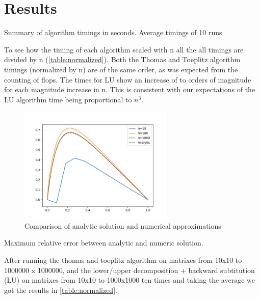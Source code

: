\section*{Results}

\begin{table}[htp]
  \centering
  \caption{Summary of algorithm timings in seconds. Average timings of 10 runs}
  \label{table:normalized}
\end{table}


To see how the timing of each algorithm scaled with n all the 
all timings are divided by n (\cref{table:normalized}). Both the Thomas and
Toeplitz algorithm timings (normalized by n) are of the same order, as was
expected from the counting of flops. The times for LU show an increase of to
orders of magnitude for each magnitude increase in n. This is consistent with
our expectations of the LU algorithm time being proportional to $n^3$.



\begin{figure}[H]
  \centering
  \includegraphics[width=0.66\textwidth]{../figures/thomas.png}
  \caption{Comparison of analytic solution and numerical approximations}
  \label{fig:a}
\end{figure}


\begin{table}[htp]
  \centering
  \caption{Maximum relative error between analytic and numeric solution.}
  \label{table:relative_error}
\end{table}



After running the thomas and toeplitz algorithm on matrixes from 10x10 to
1000000 x 1000000, and the lower/upper decomposition + backward subtitution (LU)
on matrixes from 10x10 to 1000x1000 ten times and taking the average we got the
results in \cref{table:normalized}.

